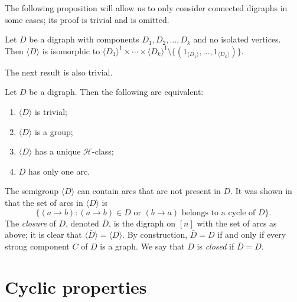 \documentclass[ALCO,ThmDefs,Unicode,epreuves]{cedram}
\newcommand{\genset}[1]{\langle#1\rangle}
\newcommand{\Hcal}{\mathcal{H}}
\newcommand{\nset}{[n]}
\begin{document}
The following proposition will allow us to only consider connected digraphs in
some cases; its proof is trivial and is omitted. 

\begin{proposition}\label{prop-direct-product}
 Let $D$ be a digraph with components $D_1, D_2, \ldots, D_k$ and no
 isolated vertices. Then $\genset{D}$ is isomorphic to
 $\genset{D_1} ^ 1\times\cdots\times \genset{D_k} ^ 1\setminus
 \{(1_{\genset{D_1}}, \ldots, 1_{\genset{D_k}})\}$. %
\end{proposition}

The next result is also trivial.

\begin{proposition}\label{prop-trivial}
 Let $D$ be a digraph. Then the following are equivalent: 
 \begin{enumerate}

 \item\label{prop2.2_1}
 $\genset{D}$ is trivial;

 \item\label{prop2.2_2}
 $\genset{D}$ is a group;

 \item\label{prop2.2_3}
 $\genset{D}$ has a unique $\Hcal$-class;

 \item\label{prop2.2_4}
 $D$ has only one arc. %
 \end{enumerate}
\end{proposition}

The semigroup $\genset{D}$ can contain arcs that are not present in $D$. It was
shown in~\cite[Lemma~2.3]{Yang2005aa} that the set of arcs in $\genset{D}$ is 
\[\{(a \to b) : (a \to b) \in D \text{ or } (b \to a) \text{ belongs to a
cycle of } D \}.\]
The \emph{closure} of $D$, denoted $\bar{D}$, is the digraph on $\nset$ with the set of arcs as above; it is clear that $\genset{\bar{D}} =
\genset{D}$. By construction, $\bar{D} = D$ if and only if every strong
component $C$ of $D$ is a graph. We say that $D$ is \emph{closed} if $\bar{D}
= D$. 


\section{Cyclic properties} \label{sec:cyclic}
\end{document}
